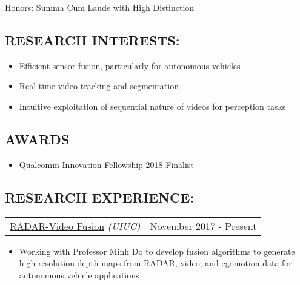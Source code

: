 \documentclass[10pt, letterpaper]{article}
\makeatletter
\newcommand{\headerrow}[2]
{\begin{tabular*}{\linewidth}{l@{\extracolsep{\fill}}r}
	#1 &
	#2 \\
\end{tabular*}}
\newcommand{\sansserif}{\cabin}
\makeatother
\begin{document}
Honors: Summa Cum Laude with High Distinction

\begin{comment}
\subsection*{\sansserif SKILLS:}
Python with TensorFlow and Caffe experience, OpenCV, MATLAB, ROS, C, C++,
	Microsoft Office Suite, \LaTeX, Linux/Ubuntu, git, svn
\end{comment}

\subsection*{\sansserif RESEARCH INTERESTS:}
\begin{itemize}
	\item Efficient sensor fusion, particularly for autonomous vehicles
	\item Real-time video tracking and segmentation
	\item Intuitive exploitation of sequential nature of videos for perception tasks
\end{itemize}


\subsection*{\sansserif AWARDS}

\begin{itemize}
	\item Qualcomm Innovation Fellowship 2018 Finalist
\end{itemize}


\subsection*{\sansserif RESEARCH EXPERIENCE:}

\headerrow
    {\uline{RADAR-Video Fusion} \textit{(UIUC)}}
    {November 2017 - Present}
    \begin{itemize}
        \item
        Working with Professor Minh Do to develop fusion algorithms to generate high resolution depth maps from RADAR, video, and egomotion data for autonomous vehicle applications
    \end{itemize}
\end{document}
